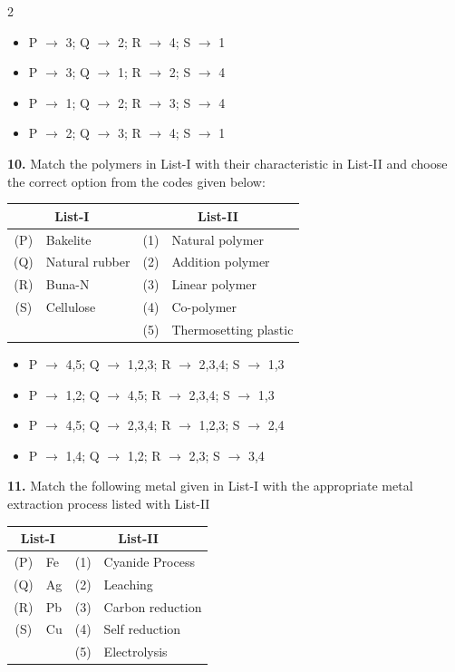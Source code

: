 \documentclass[10pt]{extarticle}
\newenvironment{qoptions}{\begin{itemize}[leftmargin=1.8em,itemsep=2pt,topsep=2pt,label={}]}{\end{itemize}}
\newcommand{\opt}[2]{\item[({#1})] {#2}}
\begin{document}
\begin{multicols}{2}
\begin{qoptions}
\opt{A}{P $\to$ 3; Q $\to$ 2; R $\to$ 4; S $\to$ 1}
\opt{B}{P $\to$ 3; Q $\to$ 1; R $\to$ 2; S $\to$ 4}
\opt{C}{P $\to$ 1; Q $\to$ 2; R $\to$ 3; S $\to$ 4}
\opt{D}{P $\to$ 2; Q $\to$ 3; R $\to$ 4; S $\to$ 1}
\end{qoptions}

\textbf{10.} Match the polymers in List-I with their characteristic in List-II and choose the correct option from the codes given below:

\begin{center}
\begin{tabular}{|c|l|c|l|}
\hline
\multicolumn{2}{|c|}{\textbf{List-I}} & \multicolumn{2}{c|}{\textbf{List-II}} \\
\hline
(P) & Bakelite & (1) & Natural polymer \\
\hline
(Q) & Natural rubber & (2) & Addition polymer \\
\hline
(R) & Buna-N & (3) & Linear polymer \\
\hline
(S) & Cellulose & (4) & Co-polymer \\
\hline
 & & (5) & Thermosetting plastic \\
\hline
\end{tabular}
\end{center}

\begin{qoptions}
\opt{A}{P $\to$ 4,5; Q $\to$ 1,2,3; R $\to$ 2,3,4; S $\to$ 1,3}
\opt{B}{P $\to$ 1,2; Q $\to$ 4,5; R $\to$ 2,3,4; S $\to$ 1,3}
\opt{C}{P $\to$ 4,5; Q $\to$ 2,3,4; R $\to$ 1,2,3; S $\to$ 2,4}
\opt{D}{P $\to$ 1,4; Q $\to$ 1,2; R $\to$ 2,3; S $\to$ 3,4}
\end{qoptions}

\textbf{11.} Match the following metal given in List-I with the appropriate metal extraction process listed with List-II

\begin{center}
\begin{tabular}{|c|l|c|l|}
\hline
\multicolumn{2}{|c|}{\textbf{List-I}} & \multicolumn{2}{c|}{\textbf{List-II}} \\
\hline
(P) & Fe & (1) & Cyanide Process \\
\hline
(Q) & Ag & (2) & Leaching \\
\hline
(R) & Pb & (3) & Carbon reduction \\
\hline
(S) & Cu & (4) & Self reduction \\
\hline
 & & (5) & Electrolysis \\
\hline
\end{tabular}
\end{center}


\end{multicols}
\end{document}
